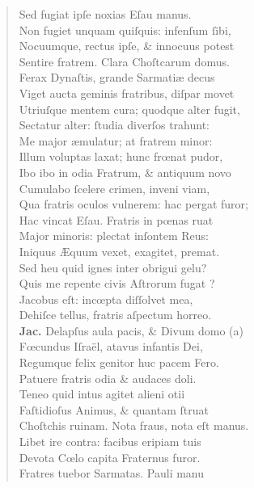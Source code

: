 \documentclass[a4paper,12pt]{article}
\begin{document}
\begin{verse}
Sed fugiat ipſe noxias Eſau manus.\\[0pt]
Non fugiet unquam quiſquis: infenſum ſibi,\\[0pt]
Nocuumque, rectus ipſe, \& innocuus potest\\[0pt]
Sentire fratrem. Clara Choſtcarum domus.\\[0pt]
Ferax Dynaſtis, grande Sarmatiæ decus\\[0pt]
Viget aucta geminis fratribus, diſpar movet\\[0pt]
Utriuſque mentem cura; quodque alter fugit,\\[0pt]
Sectatur alter: ſtudia diverſos trahunt:\\[0pt]
Me major æmulatur; at fratrem minor:\\[0pt]
Illum voluptas laxat; hunc frœnat pudor,\\[0pt]
Ibo ibo in odia Fratrum, \& antiquum novo\\[0pt]
Cumulabo ſcelere crimen, inveni viam,\\[0pt]
Qua fratris oculos vulnerem: hac pergat furor;\\[0pt]
Hac vincat Eſau. Fratris in pœnas ruat\\[0pt]
Major minoris: plectat inſontem Reus:\\[0pt]
Iniquus Æquum vexet, exagitet, premat.\\[0pt]
Sed heu quid ignes inter obrigui gelu?\\[0pt]
Quis me repente civis Aſtrorum fugat ?\\[0pt]
Jacobus eſt: incœpta diſſolvet mea,\\[0pt]
Dehiſce tellus, fratris aſpectum horreo.\\[0pt]
\textbf{Jac.} Delapſus aula pacis, \& Divum domo (a)\footnotemark\\[0pt]
Fœcundus Iſraël, atavus infantis Dei,\\[0pt]
Regumque felix genitor huc pacem Fero.\\[0pt]
Patuere fratris odia \& audaces doli.\\[0pt]
Teneo quid intus agitet alieni otii\\[0pt]
Faſtidioſus Animus, \& quantam ſtruat\\[0pt]
Choſtchis ruinam. Nota fraus, nota eſt manus.\\[0pt]
Libet ire contra: facibus eripiam tuis\\[0pt]
Devota Cœlo capita Fraternus furor.\\[0pt]
Fratres tuebor Sarmatas. Pauli manu\\[0pt]

\end{verse}
\end{document}
